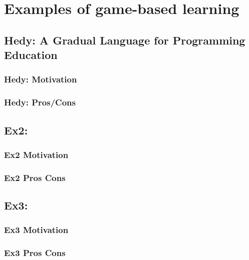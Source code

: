 \chapter{Examples of game-based learning}

\section{Hedy: A Gradual Language for Programming Education}

\subsection{Hedy: Motivation}

\subsection{Hedy: Pros/Cons}

\section{Ex2:} 

\subsection{Ex2 Motivation}

\subsection{Ex2 Pros Cons}

\section{Ex3:} 

\subsection{Ex3 Motivation}

\subsection{Ex3 Pros Cons}